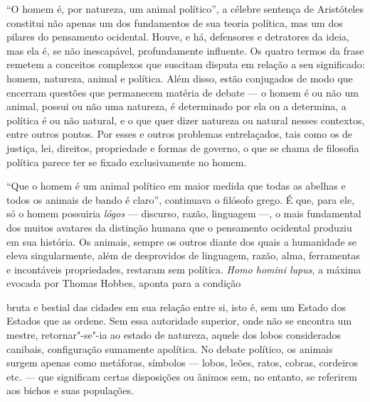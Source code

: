 \begin{multicols}{2}
\noindent{}``O homem é, por natureza, um animal político'', a célebre sentença de
Aristóteles constitui não apenas um dos fundamentos de sua teoria
política, mas um dos pilares do pensamento ocidental. Houve, e há,
defensores e detratores da ideia, mas ela é, se não inescapável,
profundamente influente. Os quatro termos da frase remetem a conceitos
complexos que suscitam disputa em relação a seu significado: homem,
natureza, animal e política. Além disso, estão conjugados de modo que
encerram questões que permanecem matéria de debate --- o homem é ou não
um animal, possui ou não uma natureza, é determinado por ela ou a
determina, a política é ou não natural, e o que quer dizer natureza ou
natural nesses contextos, entre outros pontos. Por esses e outros
problemas entrelaçados, tais como os de justiça, lei, direitos,
propriedade e formas de governo, o que se chama de filosofia política
parece ter se fixado exclusivamente no homem.

``Que o homem é um animal político em maior medida que todas as abelhas
e todos os animais de bando é claro'', continuava o filósofo grego. É
que, para ele, só o homem possuiria \emph{lógos} --- discurso, razão,
linguagem ---, o mais fundamental dos muitos avatares da distinção humana
que o pensamento ocidental produziu em sua história. Os animais, sempre
os outros diante dos quais a humanidade se eleva singularmente, além de
desprovidos de linguagem, razão, alma, ferramentas e incontáveis
propriedades, restaram sem política. \emph{Homo homini lupus}, a máxima
evocada por Thomas Hobbes, aponta para a condição

\vspace{\baselineskip}

{\small{}}

\vspace{\baselineskip}

\noindent{}bruta e bestial das
cidades em sua relação entre si, isto é, sem um Estado dos Estados que
as ordene. Sem essa autoridade superior, onde não se encontra um
mestre, retornar"-se"-ia ao estado de natureza, aquele dos lobos
considerados canibais, configuração sumamente apolítica. No debate
político, os animais surgem apenas como metáforas, símbolos --- lobos,
leões, ratos, cobras, cordeiros etc. --- que significam certas
disposições ou ânimos sem, no entanto, se referirem aos bichos e suas
populações.


\end{multicols}

